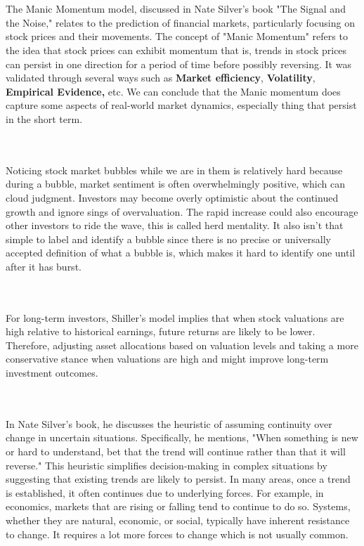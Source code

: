 \documentclass[12pt]{article}
\begin{document}
\begin{enumerate}
 \\ \\
The Manic Momentum model, discussed in Nate Silver's book "The Signal and the Noise," relates to the prediction of financial markets, particularly focusing on stock prices and their movements. The concept of "Manic Momentum" refers to the idea that stock prices can exhibit momentum that is, trends in stock prices can persist in one direction for a period of time before possibly reversing. It was validated through several ways such as \textbf{Market efficiency}, \textbf{Volatility}, \textbf{Empirical Evidence, } etc. We can conclude that the Manic momentum does capture some aspects of real-world market dynamics, especially thing that persist in the short term. 


 \\ \\
Noticing stock market bubbles while we are in them is relatively hard because during a bubble, market sentiment is often overwhelmingly positive, which can cloud judgment. Investors may become overly optimistic about the continued growth and ignore sings of overvaluation. The rapid increase could also encourage other investors to ride the wave, this is called herd mentality. It also isn't that simple to label and identify a bubble since there is no precise or universally accepted definition of what a bubble is, which makes it hard to identify one until after it has burst. 

 \\ \\
For long-term investors, Shiller’s model implies that when stock valuations are high relative to historical earnings, future returns are likely to be lower. Therefore, adjusting asset allocations based on valuation levels and taking a more conservative stance when valuations are high and might improve long-term investment outcomes. 

 \\ \\

In Nate Silver's book,  he discusses the heuristic of assuming continuity over change in uncertain situations. Specifically, he mentions, "When something is new or hard to understand, bet that the trend will continue rather than that it will reverse." This heuristic simplifies decision-making in complex situations by suggesting that existing trends are likely to persist. In many areas, once a trend is established, it often continues due to underlying forces. For example, in economics, markets that are rising or falling tend to continue to do so. Systems, whether they are natural, economic, or social, typically have inherent resistance to change. It requires a lot more forces to change which is not usually common. 


\end{enumerate}
\end{document}

